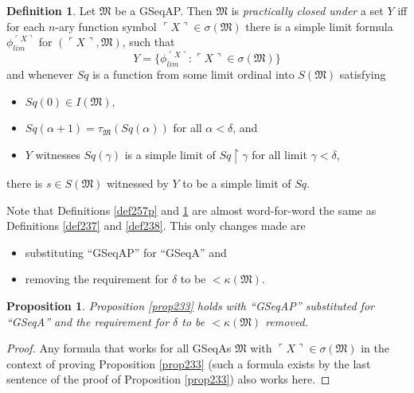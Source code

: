 \documentclass[12pt, twoside]{memoir}
\numberwithin{equation}{section}
\newtheorem{prop}[thm]{Proposition}
\theoremstyle{definition}
\newtheorem{defi}[thm]{Definition}
\theoremstyle{remark}
\theoremstyle{definition}
\theoremstyle{definition}
\theoremstyle{definition}
\theoremstyle{remark}
\begin{document}
\begin{defi}\label{def258}
Let $\mathfrak{M}$ be a GSeqAP. Then $\mathfrak{M}$ is \emph{practically closed under} a set $Y$ iff for each $n$-ary function symbol $\ulcorner X \urcorner \in \sigma(\mathfrak{M})$ there is a simple limit formula $\phi_{lim}^{\ulcorner X \urcorner}$ for $(\ulcorner X \urcorner, \mathfrak{M})$, such that 
\begin{equation*}
    Y = \{\phi_{lim}^{\ulcorner X \urcorner} : \ulcorner X \urcorner \in \sigma(\mathfrak{M})\}
\end{equation*}
and whenever $Sq$ is a function from some limit ordinal into $S(\mathfrak{M})$ satisfying
\begin{itemize}
    \item $Sq(0) \in I(\mathfrak{M})$,
    \item $Sq(\alpha + 1) = \tau_{\mathfrak{M}}(Sq(\alpha))$ for all $\alpha < \delta$, and
    \item $Y$ witnesses $Sq(\gamma)$ is a simple limit of $Sq \restriction \gamma$ for all limit $\gamma < \delta$,
\end{itemize}
there is $s \in S(\mathfrak{M})$ witnessed by $Y$ to be a simple limit of $Sq$.
\end{defi}

Note that Definitions \ref{def257p} and \ref{def258} are almost word-for-word the same as Definitions \ref{def237} and \ref{def238}. This only changes made are \begin{itemize}
    \item substituting ``GSeqAP'' for ``GSeqA'' and 
    \item removing the requirement for $\delta$ to be $< \kappa(\mathfrak{M})$.
\end{itemize} 

\begin{prop}\label{prop261c}
Proposition \ref{prop233} holds with ``GSeqAP'' substituted for ``GSeqA'' and the requirement for $\delta$ to be $< \kappa(\mathfrak{M})$ removed.
\end{prop}

\begin{proof}
Any formula that works for all GSeqAs $\mathfrak{M}$ with $\ulcorner X \urcorner \in \sigma(\mathfrak{M})$ in the context of proving Proposition \ref{prop233} (such a formula exists by the last sentence of the proof of Proposition \ref{prop233}) also works here.
\end{proof}
\end{document}
